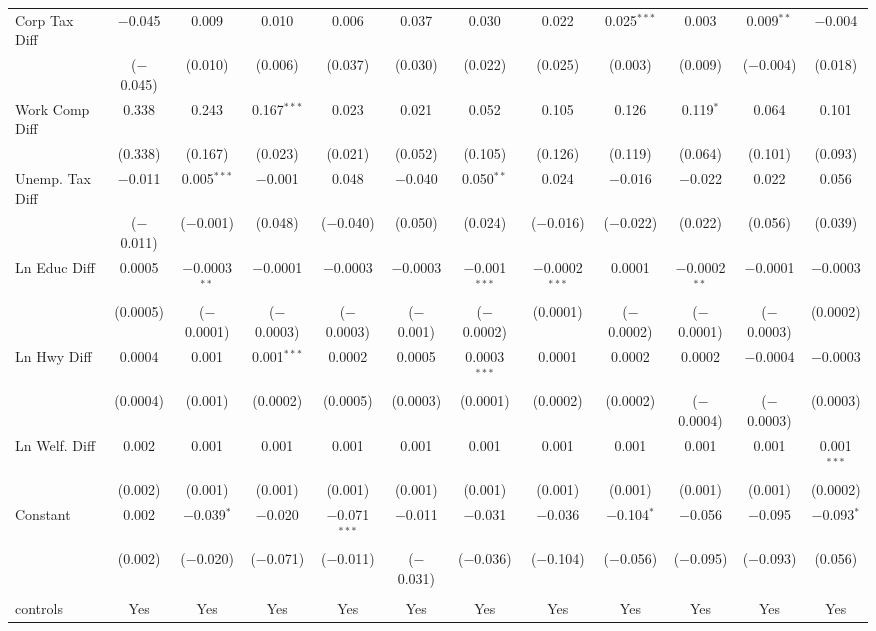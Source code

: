 \begin{table}[!htbp]
\begin{tabular}{@{\extracolsep{5pt}}lccccccccccc}
  Corp Tax Diff & $-$0.045 & 0.009 & 0.010 & 0.006 & 0.037 & 0.030 & 0.022 & 0.025$^{***}$ & 0.003 & 0.009$^{**}$ & $-$0.004 \\ 
  & ($-$0.045) & (0.010) & (0.006) & (0.037) & (0.030) & (0.022) & (0.025) & (0.003) & (0.009) & ($-$0.004) & (0.018) \\ 
  Work Comp Diff & 0.338 & 0.243 & 0.167$^{***}$ & 0.023 & 0.021 & 0.052 & 0.105 & 0.126 & 0.119$^{*}$ & 0.064 & 0.101 \\ 
  & (0.338) & (0.167) & (0.023) & (0.021) & (0.052) & (0.105) & (0.126) & (0.119) & (0.064) & (0.101) & (0.093) \\ 
  Unemp. Tax Diff & $-$0.011 & 0.005$^{***}$ & $-$0.001 & 0.048 & $-$0.040 & 0.050$^{**}$ & 0.024 & $-$0.016 & $-$0.022 & 0.022 & 0.056 \\ 
  & ($-$0.011) & ($-$0.001) & (0.048) & ($-$0.040) & (0.050) & (0.024) & ($-$0.016) & ($-$0.022) & (0.022) & (0.056) & (0.039) \\ 
  Ln Educ Diff & 0.0005 & $-$0.0003$^{**}$ & $-$0.0001 & $-$0.0003 & $-$0.0003 & $-$0.001$^{***}$ & $-$0.0002$^{***}$ & 0.0001 & $-$0.0002$^{**}$ & $-$0.0001 & $-$0.0003 \\ 
  & (0.0005) & ($-$0.0001) & ($-$0.0003) & ($-$0.0003) & ($-$0.001) & ($-$0.0002) & (0.0001) & ($-$0.0002) & ($-$0.0001) & ($-$0.0003) & (0.0002) \\ 
  Ln Hwy Diff & 0.0004 & 0.001 & 0.001$^{***}$ & 0.0002 & 0.0005 & 0.0003$^{***}$ & 0.0001 & 0.0002 & 0.0002 & $-$0.0004 & $-$0.0003 \\ 
  & (0.0004) & (0.001) & (0.0002) & (0.0005) & (0.0003) & (0.0001) & (0.0002) & (0.0002) & ($-$0.0004) & ($-$0.0003) & (0.0003) \\ 
  Ln Welf. Diff & 0.002 & 0.001 & 0.001 & 0.001 & 0.001 & 0.001 & 0.001 & 0.001 & 0.001 & 0.001 & 0.001$^{***}$ \\ 
  & (0.002) & (0.001) & (0.001) & (0.001) & (0.001) & (0.001) & (0.001) & (0.001) & (0.001) & (0.001) & (0.0002) \\ 
  Constant & 0.002 & $-$0.039$^{*}$ & $-$0.020 & $-$0.071$^{***}$ & $-$0.011 & $-$0.031 & $-$0.036 & $-$0.104$^{*}$ & $-$0.056 & $-$0.095 & $-$0.093$^{*}$ \\ 
  & (0.002) & ($-$0.020) & ($-$0.071) & ($-$0.011) & ($-$0.031) & ($-$0.036) & ($-$0.104) & ($-$0.056) & ($-$0.095) & ($-$0.093) & (0.056) \\ 
 \hline \\[-1.8ex] 
controls & Yes & Yes & Yes & Yes & Yes & Yes & Yes & Yes & Yes & Yes & Yes \\ 

\end{tabular}
\end{table}
